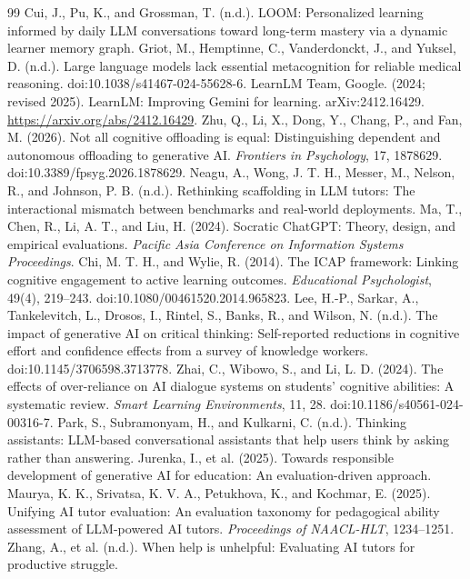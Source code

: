 \begin{thebibliography}{99}
 Cui, J., Pu, K., and Grossman, T. (n.d.). LOOM: Personalized learning informed by daily LLM conversations toward long-term mastery via a dynamic learner memory graph.
 Griot, M., Hemptinne, C., Vanderdonckt, J., and Yuksel, D. (n.d.). Large language models lack essential metacognition for reliable medical reasoning. doi:10.1038/s41467-024-55628-6.
 LearnLM Team, Google. (2024; revised 2025). LearnLM: Improving Gemini for learning. arXiv:2412.16429. \url{https://arxiv.org/abs/2412.16429}.
 Zhu, Q., Li, X., Dong, Y., Chang, P., and Fan, M. (2026). Not all cognitive offloading is equal: Distinguishing dependent and autonomous offloading to generative AI. \emph{Frontiers in Psychology}, 17, 1878629. doi:10.3389/fpsyg.2026.1878629.
 Neagu, A., Wong, J. T. H., Messer, M., Nelson, R., and Johnson, P. B. (n.d.). Rethinking scaffolding in LLM tutors: The interactional mismatch between benchmarks and real-world deployments.
 Ma, T., Chen, R., Li, A. T., and Liu, H. (2024). Socratic ChatGPT: Theory, design, and empirical evaluations. \emph{Pacific Asia Conference on Information Systems Proceedings}.
 Chi, M. T. H., and Wylie, R. (2014). The ICAP framework: Linking cognitive engagement to active learning outcomes. \emph{Educational Psychologist}, 49(4), 219--243. doi:10.1080/00461520.2014.965823.
 Lee, H.-P., Sarkar, A., Tankelevitch, L., Drosos, I., Rintel, S., Banks, R., and Wilson, N. (n.d.). The impact of generative AI on critical thinking: Self-reported reductions in cognitive effort and confidence effects from a survey of knowledge workers. doi:10.1145/3706598.3713778.
 Zhai, C., Wibowo, S., and Li, L. D. (2024). The effects of over-reliance on AI dialogue systems on students' cognitive abilities: A systematic review. \emph{Smart Learning Environments}, 11, 28. doi:10.1186/s40561-024-00316-7.
 Park, S., Subramonyam, H., and Kulkarni, C. (n.d.). Thinking assistants: LLM-based conversational assistants that help users think by asking rather than answering.
 Jurenka, I., et al. (2025). Towards responsible development of generative AI for education: An evaluation-driven approach.
 Maurya, K. K., Srivatsa, K. V. A., Petukhova, K., and Kochmar, E. (2025). Unifying AI tutor evaluation: An evaluation taxonomy for pedagogical ability assessment of LLM-powered AI tutors. \emph{Proceedings of NAACL-HLT}, 1234--1251.
 Zhang, A., et al. (n.d.). When help is unhelpful: Evaluating AI tutors for productive struggle.

\end{thebibliography}
